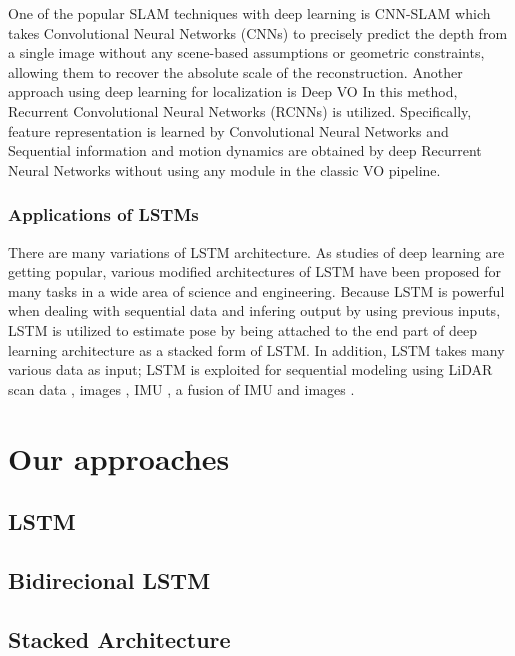 \documentclass[letterpaper, 10 pt, conference]{ieeeconf}  %
\begin{document}
One of the popular SLAM techniques with deep learning is CNN-SLAM \cite{tateno2017cnn} which takes Convolutional Neural Networks (CNNs) to precisely predict the depth from a single image without any scene-based assumptions or geometric constraints, allowing them to recover the absolute scale of the reconstruction. Another approach using deep learning for localization is Deep VO \cite{clark2017vinet} In this method, Recurrent Convolutional Neural Networks (RCNNs) is utilized. Specifically, feature representation is learned by Convolutional Neural Networks and Sequential information and motion dynamics are obtained by deep Recurrent Neural Networks without using any module in the classic VO pipeline.



\subsubsection{Applications of LSTMs}

There are many variations of LSTM architecture. As studies of deep learning are getting popular, various modified architectures of LSTM have been proposed for many tasks in a wide area of science and engineering. Because LSTM is powerful when dealing with sequential data and infering output by using previous inputs, LSTM is utilized to estimate pose by being attached to the end part of deep learning architecture \cite{wang2017deepvo, kendall2015posenet, turan2018deep}  as a stacked form of LSTM. In addition, LSTM takes many various data as input; LSTM is exploited for sequential modeling using LiDAR scan data \cite{gladh2016deep}, images \cite{walch2017image, wang2017deepvo}, IMU \cite{ordonez2016deep}, a fusion of IMU and images \cite{clark2017vinet}.


\section{Our approaches}
\subsection{LSTM}

\subsection{Bidirecional LSTM}

\subsection{Stacked Architecture}
\end{document}
